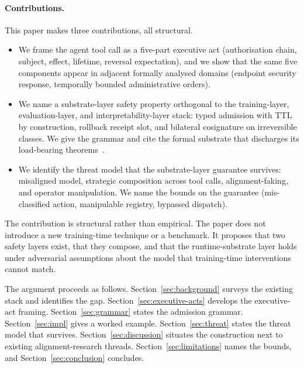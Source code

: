 \paragraph{Contributions.}
This paper makes three contributions, all structural.
\begin{itemize}
\item We frame the agent tool call as a five-part executive act (authorisation chain, subject, effect, lifetime, reversal expectation), and we show that the same five components appear in adjacent formally analysed domains (endpoint security response, temporally bounded administrative orders).
\item We name a substrate-layer safety property orthogonal to the training-layer, evaluation-layer, and interpretability-layer stack: typed admission with TTL by construction, rollback receipt slot, and bilateral cosignature on irreversible classes. We give the grammar and cite the formal substrate that discharges its load-bearing theorems~\cite{programmableSovereignty2026}.
\item We identify the threat model that the substrate-layer guarantee survives: misaligned model, strategic composition across tool calls, alignment-faking, and operator manipulation. We name the bounds on the guarantee (mis-classified action, manipulable registry, bypassed dispatch).
\end{itemize}

The contribution is structural rather than empirical. The paper does not introduce a new training-time technique or a benchmark. It proposes that two safety layers exist, that they compose, and that the runtime-substrate layer holds under adversarial assumptions about the model that training-time interventions cannot match.

The argument proceeds as follows. Section~\ref{sec:background} surveys the existing stack and identifies the gap. Section~\ref{sec:executive-acts} develops the executive-act framing. Section~\ref{sec:grammar} states the admission grammar. Section~\ref{sec:impl} gives a worked example. Section~\ref{sec:threat} states the threat model that survives. Section~\ref{sec:discussion} situates the construction next to existing alignment-research threads. Section~\ref{sec:limitations} names the bounds, and Section~\ref{sec:conclusion} concludes.
